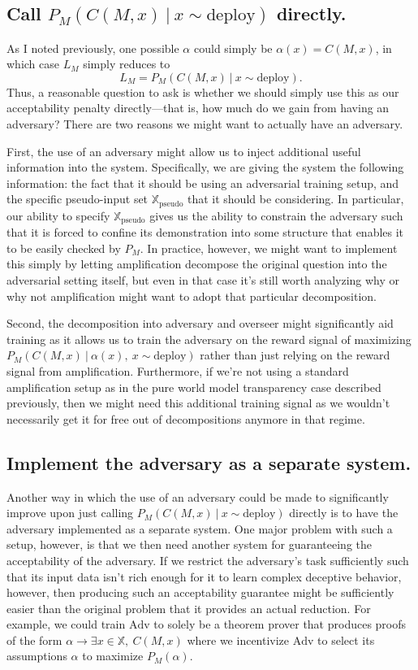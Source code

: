 \documentclass{amsart}
\begin{document}
\subsection{Call $P_M(C(M, x)\ |\ x \sim \text{deploy})$ directly.} As I noted previously, one possible $\alpha$ could simply be $\alpha(x) = C(M, x)$, in which case $L_M$ simply reduces to
\[
    L_M = P_M(C(M, x)\ |\ x \sim \text{deploy}).
\]
Thus, a reasonable question to ask is whether we should simply use this as our acceptability penalty directly---that is, how much do we gain from having an adversary? There are two reasons we might want to actually have an adversary.

First, the use of an adversary might allow us to inject additional useful information into the system. Specifically, we are giving the system the following information: the fact that it should be using an adversarial training setup, and the specific pseudo-input set $\mathbb X_\text{pseudo}$ that it should be considering. In particular, our ability to specify $\mathbb X_\text{pseudo}$ gives us the ability to constrain the adversary such that it is forced to confine its demonstration into some structure that enables it to be easily checked by $P_M$. In practice, however, we might want to implement this simply by letting amplification decompose the original question into the adversarial setting itself, but even in that case it's still worth analyzing why or why not amplification might want to adopt that particular decomposition.

Second, the decomposition into adversary and overseer might significantly aid training as it allows us to train the adversary on the reward signal of maximizing $P_M(C(M, x)\ |\ \alpha(x),~ x \sim \text{deploy})$ rather than just relying on the reward signal from amplification. Furthermore, if we're not using a standard amplification setup as in the pure world model transparency case described previously, then we might need this additional training signal as we wouldn't necessarily get it for free out of decompositions anymore in that regime.

\subsection{Implement the adversary as a separate system.} Another way in which the use of an adversary could be made to significantly improve upon just calling $P_M(C(M, x)\ |\ x \sim \text{deploy})$ directly is to have the adversary implemented as a separate system. One major problem with such a setup, however, is that we then need another system for guaranteeing the acceptability of the adversary. If we restrict the adversary's task sufficiently such that its input data isn't rich enough for it to learn complex deceptive behavior, however, then producing such an acceptability guarantee might be sufficiently easier than the original problem that it provides an actual reduction. For example, we could train $\text{Adv}$ to solely be a theorem prover that produces proofs of the form $\alpha \to \exists x \in \mathbb X,~ C(M, x)$ where we incentivize $\text{Adv}$ to select its assumptions $\alpha$ to maximize $P_M(\alpha)$.
\end{document}
